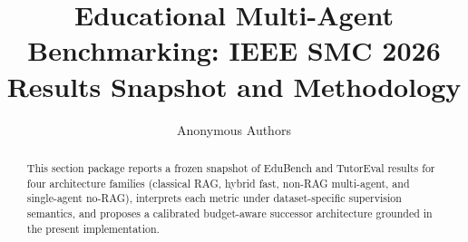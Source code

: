 \documentclass[conference]{IEEEtran}
\title{Educational Multi-Agent Benchmarking: IEEE SMC 2026 Results Snapshot and Methodology}
\author{Anonymous Authors}
\begin{document}
\maketitle

\begin{abstract}
This section package reports a frozen snapshot of EduBench and TutorEval results for four architecture families (classical RAG, hybrid fast, non-RAG multi-agent, and single-agent no-RAG), interprets each metric under dataset-specific supervision semantics, and proposes a calibrated budget-aware successor architecture grounded in the present implementation.
\end{abstract}




\end{document}
